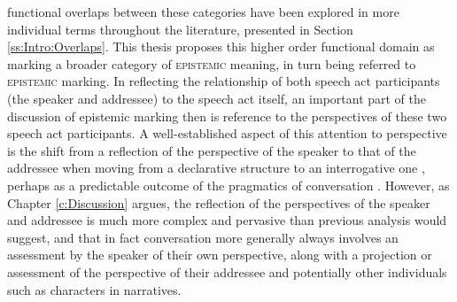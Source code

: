 functional overlaps between these categories have been explored in more individual terms throughout the literature, presented in Section \ref{ss:Intro:Overlaps}. This thesis proposes this higher order functional domain as marking a broader category of \textsc{epistemic} meaning, in turn being referred to \textsc{epistemic} marking. In reflecting the relationship of both speech act participants (the speaker and addressee) to the speech act itself, an important part of the discussion of epistemic marking then is reference to the perspectives of these two speech act participants. A well-established aspect of this attention to perspective is the shift from a reflection of the perspective of the speaker to that of the addressee when moving from a declarative structure to an interrogative one \cites[242]{Aikhenvald2004}{EgoIntro}, perhaps as a predictable outcome of the pragmatics of conversation \cite{Hill2020}. However, as Chapter \ref{c:Discussion} argues, the reflection of the perspectives of the speaker and addressee is much more complex and pervasive than previous analysis would suggest, and that in fact conversation more generally always involves an assessment by the speaker of their own perspective, along with a projection or assessment of the perspective of their addressee and potentially other individuals such as characters in narratives. 

